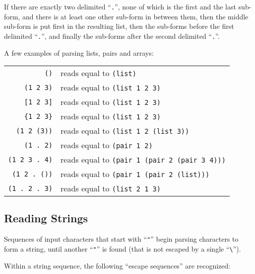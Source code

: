 If there are exactly two delimited ``\lstinline!.!'', none of which is the first and the last sub-form, and there is at least one other sub-form in between them, then the middle sub-form is put first in the resulting list, then the sub-forms before the first delimited ``\lstinline!.!'', and finally the sub-forms after the second delimited ``\lstinline!.!''. 


\example A few examples of parsing lists, pairs and arrays:

\begin{tabular}{ r l }
  \lstinline!()! & reads equal to \lstinline!(list)! \\
  \lstinline!(1 2 3)! & reads equal to \lstinline!(list 1 2 3)! \\
  \lstinline![1 2 3]! & reads equal to \lstinline!(list 1 2 3)! \\
  \lstinline!{1 2 3}! & reads equal to \lstinline!(list 1 2 3)! \\
  \lstinline!(1 2 (3))! & reads equal to \lstinline!(list 1 2 (list 3))! \\
  \lstinline!(1 . 2)! & reads equal to \lstinline!(pair 1 2)! \\
  \lstinline!(1 2 3 . 4)! & reads equal to \lstinline!(pair 1 (pair 2 (pair 3 4)))! \\
  \lstinline!(1 2 . ())! & reads equal to \lstinline!(pair 1 (pair 2 (list)))! \\
  \lstinline!(1 . 2 . 3)! & reads equal to \lstinline!(list 2 1 3)! \\
\end{tabular}






\subsection{Reading Strings}
\label{subsec:aml-base-lang-reader-strings}

Sequences of input characters that start with ``\lstinline!"!'' begin parsing characters to form a string, until another ``\lstinline!"!'' is found (that is not escaped by a single ``\lstinline!\!''). %

Within a string sequence, the following ``escape sequences'' are recognized:

